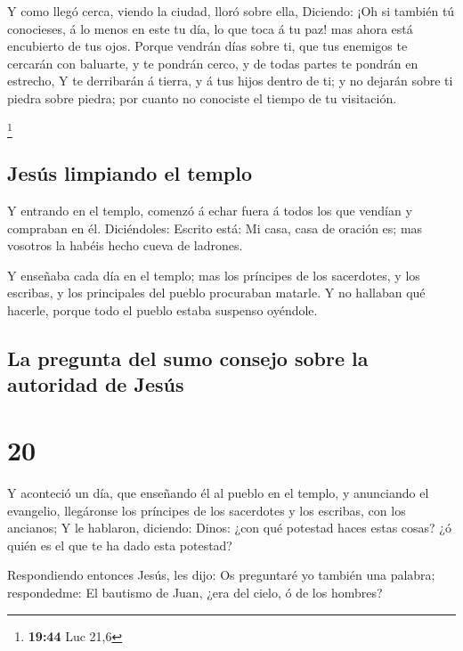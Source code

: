  Y como llegó cerca, viendo la ciudad, lloró sobre ella,
 Diciendo: ¡Oh si también tú conocieses, á lo menos en
este tu día, lo que toca á tu paz! mas ahora está encubierto de tus
ojos.  Porque vendrán días sobre ti, que tus enemigos te
cercarán con baluarte, y te pondrán cerco, y de todas partes te pondrán
en estrecho,  Y te derribarán á tierra, y á tus hijos
dentro de ti; y no dejarán sobre ti piedra sobre piedra; por cuanto no
conociste el tiempo de tu visitación.

\footnote{\textbf{19:44} Luc 21,6}

\hypertarget{jesuxfas-limpiando-el-templo}{%
\subsection{Jesús limpiando el
templo}\label{jesuxfas-limpiando-el-templo}}

 Y entrando en el templo, comenzó á echar fuera á todos
los que vendían y compraban en él.  Diciéndoles: Escrito
está: Mi casa, casa de oración es; mas vosotros la habéis hecho cueva de
ladrones.

 Y enseñaba cada día en el templo; mas los príncipes de
los sacerdotes, y los escribas, y los principales del pueblo procuraban
matarle.  Y no hallaban qué hacerle, porque todo el
pueblo estaba suspenso oyéndole.

\hypertarget{la-pregunta-del-sumo-consejo-sobre-la-autoridad-de-jesuxfas}{%
\subsection{La pregunta del sumo consejo sobre la autoridad de
Jesús}\label{la-pregunta-del-sumo-consejo-sobre-la-autoridad-de-jesuxfas}}

\hypertarget{section-19}{%
\section{20}\label{section-19}}

 Y aconteció un día, que enseñando él al pueblo en el
templo, y anunciando el evangelio, llegáronse los príncipes de los
sacerdotes y los escribas, con los ancianos;  Y le
hablaron, diciendo: Dinos: ¿con qué potestad haces estas cosas? ¿ó quién
es el que te ha dado esta potestad?

 Respondiendo entonces Jesús, les dijo: Os preguntaré yo
también una palabra; respondedme:  El bautismo de Juan,
¿era del cielo, ó de los hombres?

